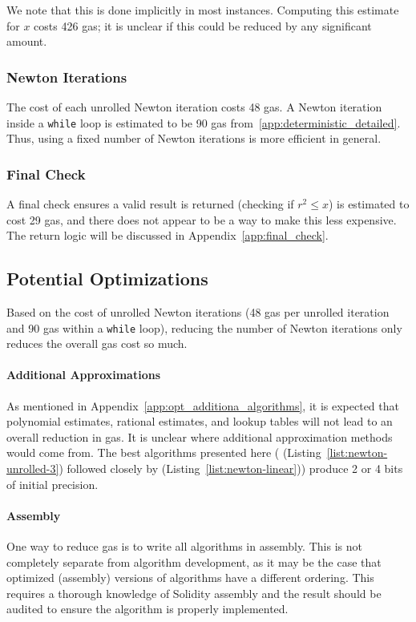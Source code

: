\noindent
We note that this is done implicitly in most instances.
Computing this estimate for $x$ costs 426 gas;
it is unclear if this could be reduced by any significant amount.

\subsubsection{Newton Iterations}

The cost of each unrolled Newton iteration costs 48 gas.
A Newton iteration inside a \texttt{while} loop
is estimated to be 90 gas from~\ref{app:deterministic_detailed}.
Thus, using a fixed number of Newton iterations is more efficient
in general.

\subsubsection{Final Check}

A final check ensures a valid result is returned
(checking if $r^{2} \le x$) is estimated to cost 29 gas,
and there does not appear to be a way to make this less expensive.
The return logic will be discussed in Appendix~\ref{app:final_check}.


\subsection{Potential Optimizations}

Based on the cost of unrolled Newton iterations (48 gas per unrolled iteration
and 90 gas within a \texttt{while} loop),
reducing the number of Newton iterations only reduces the overall
gas cost so much.

\paragraph{Additional Approximations}
As mentioned in Appendix~\ref{app:opt_additiona_algorithms},
it is expected that polynomial estimates, rational estimates,
and lookup tables will not lead to an overall reduction in gas.
It is unclear where additional approximation methods would come from.
The best algorithms presented here
(\UnrolledThree{} (Listing~\ref{list:newton-unrolled-3})
followed closely by \Linear{} (Listing~\ref{list:newton-linear}))
produce 2 or 4 bits of initial precision.

\paragraph{Assembly}
One way to reduce gas is to write all algorithms in assembly.
This is not completely separate from algorithm development,
as it may be the case that optimized (assembly) versions
of algorithms have a different ordering.
This requires a thorough knowledge of Solidity assembly
and the result should be audited to ensure the algorithm
is properly implemented.
